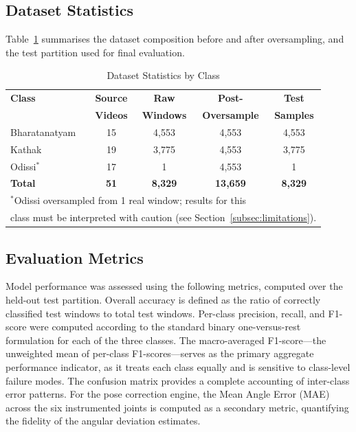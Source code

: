 \documentclass[journal]{IEEEtran}
\begin{document}
\subsection{Dataset Statistics}

Table~\ref{tab:dataset} summarises the dataset composition before and
after oversampling, and the test partition used for final evaluation.

\begin{table}[!t]
\caption{Dataset Statistics by Class}
\label{tab:dataset}
\centering
\begin{tabular}{lcccc}
\toprule
\textbf{Class} & \textbf{Source} & \textbf{Raw} & \textbf{Post-} & \textbf{Test}\\
& \textbf{Videos} & \textbf{Windows} & \textbf{Oversample} & \textbf{Samples}\\
\midrule
Bharatanatyam & 15 & 4,553 & 4,553 & 4,553 \\
Kathak        & 19 & 3,775 & 4,553 & 3,775 \\
Odissi$^{*}$  & 17 & 1     & 4,553 & 1 \\
\midrule
\textbf{Total} & \textbf{51} & \textbf{8,329} & \textbf{13,659} & \textbf{8,329} \\
\bottomrule
\multicolumn{5}{l}{$^{*}$Odissi oversampled from 1 real window; results for this}\\
\multicolumn{5}{l}{class must be interpreted with caution (see Section~\ref{subsec:limitations}).}\\
\end{tabular}
\end{table}

\subsection{Evaluation Metrics}

Model performance was assessed using the following metrics, computed
over the held-out test partition. Overall accuracy is defined as the
ratio of correctly classified test windows to total test windows.
Per-class precision, recall, and F1-score were computed according to
the standard binary one-versus-rest formulation for each of the three
classes. The macro-averaged F1-score—the unweighted mean of per-class
F1-scores—serves as the primary aggregate performance indicator, as
it treats each class equally and is sensitive to class-level failure
modes. The confusion matrix provides a complete accounting of
inter-class error patterns. For the pose correction engine, the
Mean Angle Error (MAE) across the six instrumented joints is computed
as a secondary metric, quantifying the fidelity of the angular
deviation estimates.
\end{document}
